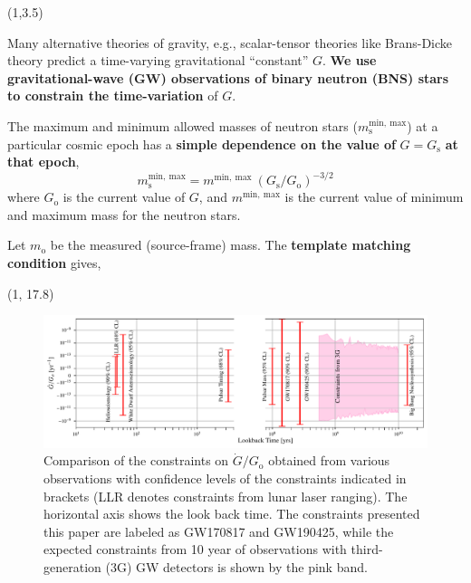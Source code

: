 \documentclass[a1,portrait]{a1poster}
\newcommand{\headingcolor}{\color{BannerElevenColor}}
\newcommand{\ms}{m_\mathrm{s}}
\newcommand{\mo}{m_\mathrm{o}}
\newcommand{\Gs}{G_\mathrm{s}}
\newcommand{\Go}{G_\mathrm{o}}
\def\LHead#1{\noindent{\LARGE \headingcolor #1}\smallskip}
\begin{document}


\begin{textblock}{7}(1,3.5)	%
\LHead{Background}

Many alternative theories of gravity, e.g., scalar-tensor theories like Brans-Dicke theory predict a time-varying gravitational ``constant'' $G$. \textbf{We use gravitational-wave (GW) observations of binary neutron (BNS) stars to constrain the time-variation} of $G$.

The maximum and minimum allowed masses of neutron stars ($\ms^\mathrm{min,~max}$) at a particular cosmic epoch has a \textbf{simple dependence on the value of} $G=\Gs$ \textbf{at that epoch},
\begin{equation}
\ms^\mathrm{min,~max} = m^\mathrm{min,~max} ~ (\Gs/\Go)^{-3/2}
\label{eq:m_max_min}
\end{equation}
where $\Go$ is the current value of $ G $, and $m^\mathrm{min,~max}$ is the current value of minimum and maximum mass for the neutron stars.

Let $ \mo $ be the measured (source-frame) mass. The \textbf{template matching condition} gives,
\begin{textblock}{15}(1, 17.8)
	\begin{figure}[t]
		\centering
		\includegraphics[width=0.95\linewidth]{gdot_over_cosmic_time.pdf}
		\caption{Comparison of the constraints on $\dot{G}/\Go$ obtained from various observations with confidence levels of the constraints indicated in brackets (LLR denotes constraints from lunar laser ranging). The horizontal axis shows the look back time. The constraints presented this paper are labeled as GW170817 and GW190425, while the expected constraints from 10 year of observations with third-generation (3G) GW detectors is shown by the pink band.}
		\label{fig:gdot_plots}
	\end{figure}
\end{textblock}


\end{textblock}
\end{document}
